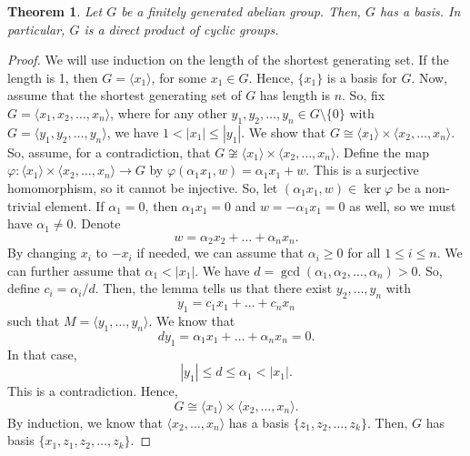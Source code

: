 \documentclass[a4paper, openany]{memoir}
\theoremstyle{definition}
\theoremstyle{plain}
\newtheorem{theorem}[definition]{Theorem}
\begin{document}
    \begin{theorem}
        Let $G$ be a finitely generated abelian group. Then, $G$ has a basis. In particular, $G$ is a direct product of cyclic groups.
    \end{theorem}
    \begin{proof}
        We will use induction on the length of the shortest generating set. If the length is 1, then $G = \langle x_1 \rangle$, for some $x_1 \in G$. Hence, $\{x_1\}$ is a basis for $G$. Now, assume that the shortest generating set of $G$ has length is $n$. So, fix $G = \langle x_1, x_2, \dots, x_n \rangle$, where for any other $y_1, y_2, \dots, y_n \in G \setminus \{0\}$ with $G = \langle y_1, y_2, \dots, y_n \rangle$, we have $1 < |x_1| \leq |y_1|$. We show that $G \cong \langle x_1 \rangle \times \langle x_2, \dots, x_n \rangle$. So, assume, for a contradiction, that $G \not\cong \langle x_1 \rangle \times \langle x_2, \dots, x_n \rangle$. Define the map $\varphi: \langle x_1 \rangle \times \langle x_2, \dots, x_n \rangle \to G$ by $\varphi(\alpha_1 x_1, w) = \alpha_1 x_1 + w$. This is a surjective homomorphism, so it cannot be injective. So, let $(\alpha_1 x_1, w) \in \ker \varphi$ be a non-trivial element. If $\alpha_1 = 0$, then $\alpha_1 x_1 = 0$ and $w = - \alpha_1 x_1 = 0$ as well, so we must have $\alpha_1 \neq 0$. Denote
        \[w = \alpha_2 x_2 + \dots + \alpha_n x_n.\]
        By changing $x_i$ to $-x_i$ if needed, we can assume that $\alpha_i \geq 0$ for all $1 \leq i \leq n$. We can further assume that $\alpha_1 < |x_1|$. We have $d = \gcd(\alpha_1, \alpha_2, \dots, \alpha_n) > 0$. So, define $c_i = \alpha_i/d$. Then, the lemma tells us that there exist $y_2, \dots, y_n$ with
        \[y_1 = c_1 x_1 + \dots + c_n x_n\]
        such that $M = \langle y_1, \dots, y_n \rangle$. We know that 
        \[dy_1 = \alpha_1 x_1 + \dots + \alpha_n x_n = 0.\]
        In that case, 
        \[|y_1| \leq d \leq \alpha_1 < |x_1|.\]
        This is a contradiction. Hence, 
        \[G \cong \langle x_1 \rangle \times \langle x_2, \dots, x_n \rangle.\]
        By induction, we know that $\langle x_2, \dots, x_n \rangle$ has a basis $\{z_1, z_2, \dots, z_k\}$. Then, $G$ has basis $\{x_1, z_1, z_2, \dots, z_k\}$.
    \end{proof}
\end{document}
